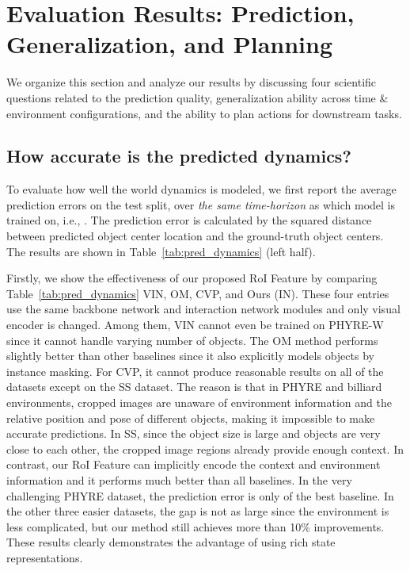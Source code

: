 \documentclass{article} \usepackage{iclr2021_conference,times}
\begin{document}
\vspace{-0.75em}
\section{Evaluation Results: Prediction, Generalization, and Planning}
\label{sec:exp}
\vspace{-0.75em}

We organize this section and analyze our results by discussing four scientific questions related to the prediction quality, generalization ability across time \& environment configurations, and the ability to plan actions for downstream tasks.

\vspace{-0.5em}
\subsection{How accurate is the predicted dynamics?}
\label{sec:exp_pred}\vspace{-0.5em}
To evaluate how well the world dynamics is modeled, we first report the average prediction errors on the test split, over \textit{the same time-horizon} as which model is trained on, i.e., . The prediction error is calculated by the squared  distance between predicted object center location and the ground-truth object centers. The results are shown in Table~\ref{tab:pred_dynamics} (left half).

Firstly, we show the effectiveness of our proposed RoI Feature by comparing  Table~\ref{tab:pred_dynamics} VIN, OM, CVP, and Ours (IN). These four entries use the same backbone network and interaction network modules and only visual encoder is changed. Among them, VIN cannot even be trained on PHYRE-W since it cannot handle varying number of objects. The OM method performs slightly better than other baselines since it also explicitly models objects by instance masking. For CVP, it cannot produce reasonable results on all of the datasets except on the SS dataset. The reason is that in PHYRE and billiard environments, cropped images are unaware of environment information and the relative position and pose of different objects, making it impossible to make accurate predictions. In SS, since the object size is large and objects are very close to each other, the cropped image regions already provide enough context. In contrast, our RoI Feature can implicitly encode the context and environment information and it performs much better than all baselines. In the very challenging PHYRE dataset, the prediction error is only  of the best baseline. In the other three easier datasets, the gap is not as large since the environment is less complicated, but our method still achieves more than 10\% improvements. These results clearly demonstrates the advantage of using rich state representations. 
\end{document}
